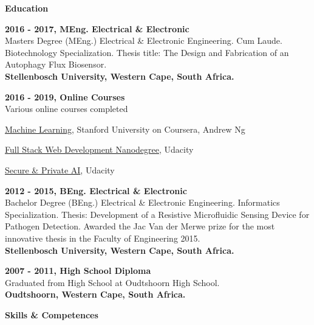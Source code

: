 \documentclass[a4paper,12pt,final]{memoir}
\newcommand{\SmallSep}{\vspace{0.5em}}
\newcommand{\CVSection}[1]
	{\Large\textbf{#1}\par
	\SmallSep\normalsize\normalfont}
\newcommand{\CVItem}[1]
	{\textbf{\color{RoyalBlue} #1}}
\begin{document}
\CVSection{Education}
\CVItem{2016 - 2017, MEng. Electrical \& Electronic}\\
Masters Degree (MEng.) Electrical \& Electronic Engineering. Cum Laude. Biotechnology Specialization. Thesis title: The Design and Fabrication of an Autophagy Flux Biosensor.\\ \textbf{Stellenbosch University, Western Cape, South Africa.} \SmallSep

\CVItem{2016 - 2019, Online Courses}\\
Various online courses completed

	\begin{compactitem}[\color{RoyalBlue}$\circ$]
		\item \href{https://www.coursera.org/account/accomplishments/certificate/AAHD8EMUXK8G}{Machine Learning}, Stanford University on Coursera, Andrew Ng 
		\item \href{https://confirm.udacity.com/DQXWUUCZ}{Full Stack Web Development Nanodegree}, Udacity
		\item \href{}{Secure \& Private AI}, Udacity
	\end{compactitem}

\SmallSep
\newpage


\begin{flushright}\small
	
\end{flushright}\normalsize
\framebreak

\SmallSep
\CVItem{2012 - 2015, BEng. Electrical \& Electronic}\\
Bachelor Degree (BEng.) Electrical \& Electronic Engineering. Informatics Specialization. Thesis: Development of a Resistive Microfluidic Sensing Device for Pathogen Detection. Awarded the Jac Van der Merwe prize for the most innovative thesis in the Faculty of Engineering 2015.\\ \textbf{Stellenbosch University, Western Cape, South Africa.} \SmallSep 
\SmallSep

\CVItem{2007 - 2011, High School Diploma}\\
Graduated from High School at Oudtshoorn High School.\\ \textbf{Oudtshoorn, Western Cape, South Africa.}  
\SmallSep

\CVSection{Skills \& Competences}
\end{document}
